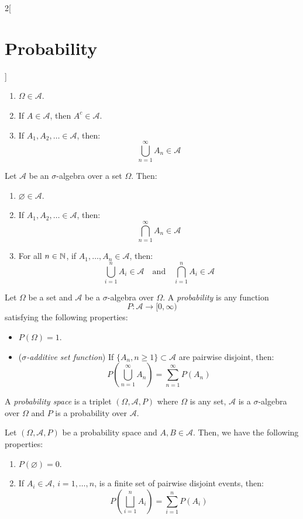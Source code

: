 \documentclass[../../../main.tex]{subfiles}
\begin{document}
\begin{multicols}{2}[\section{Probability}]
\begin{definition}
    \begin{enumerate}
      \item $\Omega\in\mathcal{A}$.
      \item If $A\in\mathcal{A}$, then $A^c\in\mathcal{A}$.
      \item If $A_1,A_2,\ldots\in\mathcal{A}$, then: $$\bigcup_{n=1}^\infty A_n\in\mathcal{A}$$
    \end{enumerate}
  \end{definition}
  \begin{prop}
    Let $\mathcal{A}$ be an $\sigma$-algebra over a set $\Omega$. Then:
    \begin{enumerate}
      \item $\varnothing\in\mathcal{A}$.
      \item If $A_1,A_2,\ldots\in\mathcal{A}$, then: $$\bigcap_{n=1}^\infty A_n\in\mathcal{A}$$
      \item For all $n\in\mathbb{N}$, if $A_1,\ldots,A_n\in\mathcal{A}$, then: $$\bigcup_{i=1}^nA_i\in\mathcal{A}\quad\text{and}\quad\bigcap_{i=1}^nA_i\in\mathcal{A}$$
    \end{enumerate}
  \end{prop}
  \begin{definition}
    Let $\Omega$ be a set and $\mathcal{A}$ be a $\sigma$-algebra over $\Omega$. A \textit{probability} is any function $$P:\mathcal{A}\longrightarrow[0,\infty)$$ satisfying the following properties:
    \begin{itemize}
      \item $P(\Omega)=1$.
      \item (\textit{$\sigma$-additive set function}) If $\{A_n,n\geq1\}\subset\mathcal{A}$ are pairwise disjoint, then: $$P\left(\bigcup_{n=1}^\infty A_n\right)=\sum_{n=1}^\infty P(A_n)$$
    \end{itemize}
  \end{definition}
  \begin{definition}
    A \textit{probability space} is a triplet $(\Omega,\mathcal{A},P)$ where $\Omega$ is any set, $\mathcal{A}$ is a $\sigma$-algebra over $\Omega$ and $P$ is a probability over $\mathcal{A}$.
  \end{definition}
  \begin{prop}
    Let $(\Omega,\mathcal{A},P)$ be a probability space and $A,B\in\mathcal{A}$. Then, we have the following properties:
    \begin{enumerate}
      \item $P(\varnothing)=0$.
      \item If $A_i\in\mathcal{A}$, $i=1,\ldots,n$, is a finite set of pairwise disjoint events, then: $$P\left(\bigsqcup_{i=1}^n A_i\right)=\sum_{i=1}^n P(A_i)$$

\end{enumerate}
\end{prop}
\end{multicols}
\end{document}

